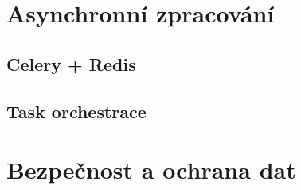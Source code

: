 

\section{Asynchronní zpracování}
\label{sec:async}


\subsection{Celery + Redis}


\subsection{Task orchestrace}


\section{Bezpečnost a ochrana dat}
\label{sec:bezpecnost}



